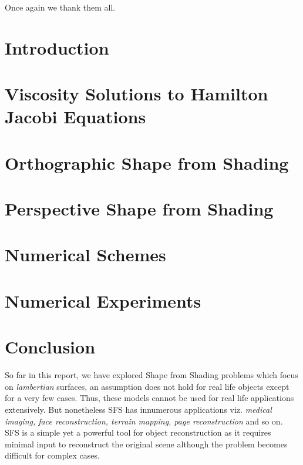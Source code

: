 \documentclass{report}[14pt]
\begin{document}
	\noindent
	Once again we thank them all.

	\listoffigures
	\tableofcontents
	\chapter{Introduction}
	

	\chapter{Viscosity Solutions to Hamilton Jacobi Equations}
	

	\chapter{Orthographic Shape from Shading}
	

	\chapter{Perspective Shape from Shading}
	

	\chapter{Numerical Schemes}
	

	\chapter{Numerical Experiments}
	

	\chapter{Conclusion}
	So far in this report, we have explored Shape from Shading problems which focus on \emph{lambertian} surfaces, an assumption does not hold for real life objects except for a very few cases. Thus, these models cannot be used for real life applications extensively. But nonetheless SFS has innumerous applications viz. \emph{medical imaging, face reconstruction, terrain mapping, page reconstruction} and so on.\\
	
	\noindent 
	SFS is a simple yet a powerful tool for object reconstruction as it requires minimal input to reconstruct the original scene although the problem becomes difficult for complex cases. \\
	
\end{document}

